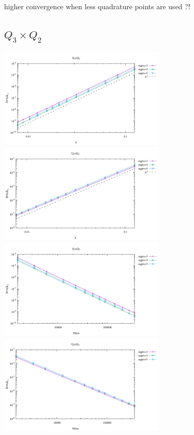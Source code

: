 higher convergence when less quadrature points are used ?!

\newpage
\subsection*{$Q_3\times Q_2$}

\begin{center}
\includegraphics[width=8cm]{python_codes/fieldstone_120/results/Q3Q2-velocity-h.pdf}
\includegraphics[width=8cm]{python_codes/fieldstone_120/results/Q3Q2-pressure-h.pdf}\\
\includegraphics[width=8cm]{python_codes/fieldstone_120/results/Q3Q2-velocity-Nfem.pdf}
\includegraphics[width=8cm]{python_codes/fieldstone_120/results/Q3Q2-pressure-Nfem.pdf}
\end{center}

